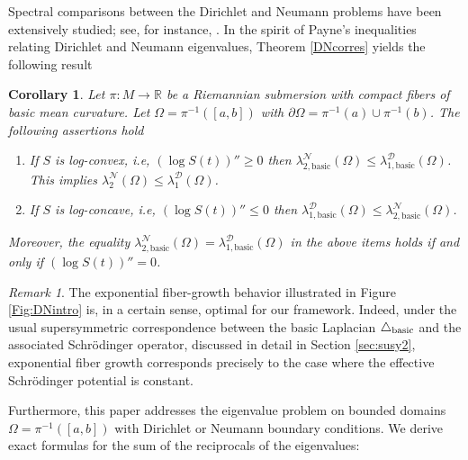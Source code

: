 \documentclass{amsart}
\newtheorem{corollary}[theorem]{Corollary}
\theoremstyle{definition}
\theoremstyle{remark}
\newtheorem{remark}[theorem]{Remark}
\numberwithin{equation}{section}
\begin{document}
Spectral comparisons between the Dirichlet and Neumann problems have been extensively studied; see, for instance, \cite{LevineWeinberger1986, Friedlander1991, Hansson2008, FrankLaptev2010, ArendtMazzeo2012, Rohleder2021Schrodinger, Rohleder2025, HuaMunchZhang2026}. In the spirit of Payne's inequalities \cite{Payne1955} relating Dirichlet and Neumann eigenvalues, Theorem \ref{DNcorres} yields the following result

\begin{corollary}\label{PAYNE}
Let $\pi: M\to \mathbb{R}$ be a Riemannian submersion with compact fibers of basic mean curvature. Let $\Omega=\pi^{-1}([a,b])$ with $\partial \Omega=\pi^{-1}(a)\cup\pi^{-1}(b)$. The following assertions hold
\begin{enumerate}
    \item If $S$ is log-convex, i.e, $(\log{S(t)})''\geq0$ then  $\lambda_{2,{\text{basic}}}^{\mathcal{N}}(\Omega) \leq \lambda_{1, \text{basic}}^{\mathcal{D}}(\Omega)$. This implies $\lambda_{2}^{\mathcal{N}}(\Omega) \leq \lambda_{1}^{\mathcal{D}}(\Omega)$.
    \item If $S$ is log-concave, i.e, $(\log{S(t)})'' \leq 0$ then  $\lambda_{1,{\text{basic}}}^{\mathcal{D}}(\Omega) \leq \lambda_{2, \text{basic}}^{\mathcal{N}}(\Omega)$.
\end{enumerate}
Moreover, the equality $\lambda_{2,{\text{basic}}}^{\mathcal{N}}(\Omega) = \lambda_{1, \text{basic}}^{\mathcal{D}}(\Omega)$ 
in the above items holds if and only if $(\log{S(t)})''=0$. 
\end{corollary}



\begin{remark} The exponential fiber-growth behavior illustrated in Figure \ref{Fig:DNintro} is, in a certain sense, optimal for our framework. Indeed, under the usual supersymmetric correspondence between the basic Laplacian $\triangle_{\rm basic}$ and the associated Schr\"{o}dinger operator, discussed in detail in Section \ref{sec:susy2}, exponential fiber growth corresponds precisely to the case where the effective Schr\"{o}dinger potential is constant.
\end{remark}


Furthermore, this paper addresses the eigenvalue problem on bounded domains $\Omega = \pi^{-1}([a,b])$ with Dirichlet or Neumann boundary conditions. We derive exact formulas for the sum of the reciprocals of the eigenvalues:
\end{document}
